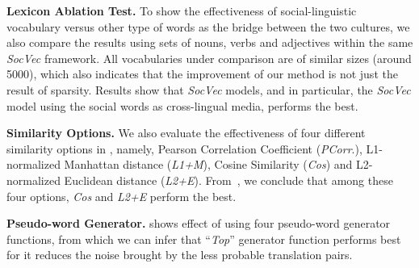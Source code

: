 \textbf{Lexicon Ablation Test.} To show the effectiveness of social-linguistic vocabulary versus other type
of words as the bridge between the two cultures, we also compare the
results using sets of nouns, verbs and adjectives within the 
same \textit{SocVec} framework.
All vocabularies under comparison are of similar sizes 
(around 5000), which also indicates that the improvement of our method 
is not just the result of sparsity.
Results show that \textit{SocVec} models, and in particular, the \textit{SocVec} model using the social words as cross-lingual media, performs the best. 

\textbf{Similarity Options.} We also evaluate the effectiveness of four different similarity options in 
\textit{\socvec}, namely, Pearson Correlation Coefficient 
(\textit{PCorr}.), L1-normalized Manhattan distance (\textit{L1+M}), 
Cosine Similarity (\textit{Cos}) and  L2-normalized Euclidean distance (\textit{L2+E}).
From~, we conclude that among these four options, \textit{Cos} and \textit{L2+E} perform the best. 

\textbf{Pseudo-word Generator.} 
 shows effect of using four pseudo-word generator functions, from which we can infer that ``\textit{Top}'' generator function performs best for 
it reduces the noise brought by the less probable translation pairs. 
